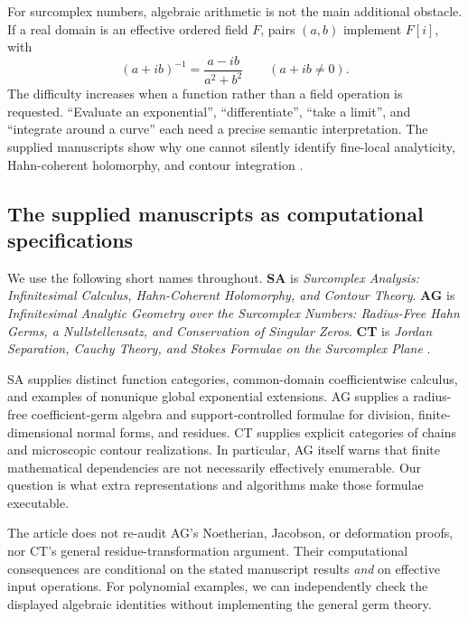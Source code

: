 \documentclass[11pt,letterpaper]{article}
\theoremstyle{definition}\newtheorem{definition}[theorem]{Definition}
\theoremstyle{remark}\newtheorem{remark}[theorem]{Remark}
\numberwithin{equation}{section}\setcounter{tocdepth}{2}
\begin{document}
For surcomplex numbers, algebraic arithmetic is not the main additional obstacle. If a real domain is an effective ordered field $F$, pairs $(a,b)$ implement $F[i]$, with
\[
 (a+ib)^{-1}=\frac{a-ib}{a^2+b^2}\qquad(a+ib\ne0).
\]
The difficulty increases when a function rather than a field operation is requested. ``Evaluate an exponential'', ``differentiate'', ``take a limit'', and ``integrate around a curve'' each need a precise semantic interpretation. The supplied manuscripts show why one cannot silently identify fine-local analyticity, Hahn-coherent holomorphy, and contour integration \cite{SA,AG,CT}.

\subsection{The supplied manuscripts as computational specifications}
We use the following short names throughout. \textbf{SA} is \emph{Surcomplex Analysis: Infinitesimal Calculus, Hahn-Coherent Holomorphy, and Contour Theory}. \textbf{AG} is \emph{Infinitesimal Analytic Geometry over the Surcomplex Numbers: Radius-Free Hahn Germs, a Nullstellensatz, and Conservation of Singular Zeros}. \textbf{CT} is \emph{Jordan Separation, Cauchy Theory, and Stokes Formulae on the Surcomplex Plane} \cite{SA,AG,CT}.

SA supplies distinct function categories, common-domain coefficientwise calculus, and examples of nonunique global exponential extensions. AG supplies a radius-free coefficient-germ algebra and support-controlled formulae for division, finite-dimensional normal forms, and residues. CT supplies explicit categories of chains and microscopic contour realizations. In particular, AG itself warns that finite mathematical dependencies are not necessarily effectively enumerable. Our question is what extra representations and algorithms make those formulae executable.

The article does not re-audit AG's Noetherian, Jacobson, or deformation proofs, nor CT's general residue-transformation argument. Their computational consequences are conditional on the stated manuscript results \emph{and} on effective input operations. For polynomial examples, we can independently check the displayed algebraic identities without implementing the general germ theory.
\end{document}
